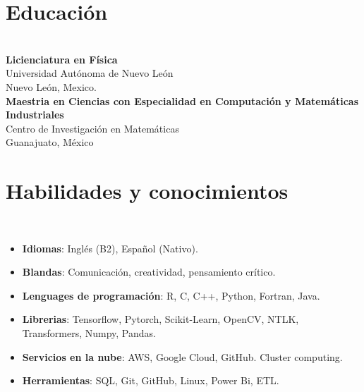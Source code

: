 \documentclass[a3paper]{adcv_color}
\newcommand{\proyect}[2]{
\textbf{#2}\\
{\color{linktext}	\textbf {#1}}
\vspace{-1cm}\\
}
\begin{document}
\begin{minipage}{0.38\linewidth}
	\section{Educación}\\

	\textbf{Licienciatura en Física} \\
	Universidad Autónoma de Nuevo León\\
	Nuevo León, Mexico.\\

	\textbf{Maestria en Ciencias con Especialidad en Computación y Matemáticas Industriales}\\
	Centro de Investigación en Matemáticas\\
	Guanajuato, México
\end{minipage}
\begin{minipage}{0.62\linewidth}
	\section{Habilidades y conocimientos}\\
	\begin{itemize}
		\setlength\itemsep{0em}
		\item \textbf{Idiomas}: Inglés (B2), Español (Nativo).
		\item \textbf{Blandas}:
		      Comunicación, creatividad, pensamiento crítico.
		\item \textbf{Lenguages de programación}:
		      R, C, C++, Python, Fortran, Java.
		\item \textbf{Librerias}:
		      Tensorflow, Pytorch, Scikit-Learn, OpenCV, NTLK, Transformers, Numpy, Pandas.
		\item \textbf{Servicios en la nube}:
		      AWS, Google Cloud, GitHub. Cluster computing.
		\item \textbf{Herramientas}:
		      SQL, Git, GitHub, Linux, Power Bi, ETL.
	\end{itemize}
\end{minipage}



\end{document}

